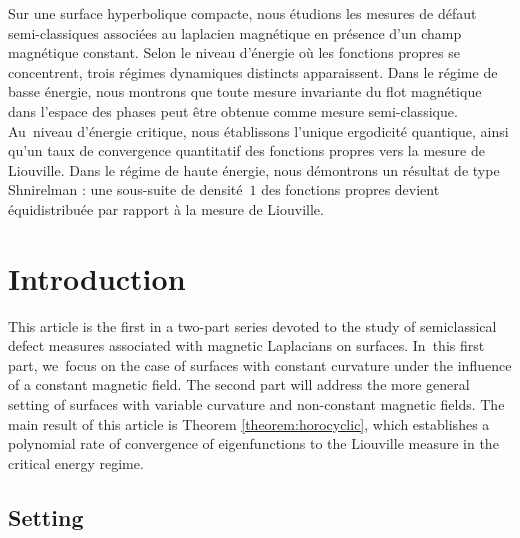 \documentclass[JEP,XML,SOM,Unicode,published]{cedram}
\theoremstyle{plain}
\theoremstyle{definition}
\begin{document}
\begin{altabstract}
Sur une surface hyperbolique compacte, nous étudions les mesures de défaut semi-classiques associées au laplacien magnétique en présence d’un champ magnétique constant. Selon le \hbox{niveau} d’énergie où les fonctions propres se concentrent, trois régimes dynamiques distincts appa\-rais\-sent. Dans le régime de basse énergie, nous montrons que toute mesure invariante du flot magné\-tique dans l’espace des phases peut être obtenue comme mesure semi-classique. Au~\hbox{niveau} d’énergie critique, nous établissons l’unique ergodicité quantique, ainsi qu’un taux de convergence quantitatif des fonctions propres vers la mesure de Liouville. Dans le régime de haute énergie, nous démontrons un résultat de type Shnirelman : une sous-suite de densité~$1$ des fonctions propres devient équidistribuée par rapport à la mesure de Liouville.
\end{altabstract}

\maketitle

\tableofcontents
\mainmatter

\section{Introduction}

This article is the first in a two-part series devoted to the study of semiclassical defect measures associated with magnetic Laplacians on surfaces. In~this first part, we~focus on the case of surfaces with constant curvature under the influence of a constant magnetic field. The second part \cite{Charles-Lefeuvre-25-2} will address the more general setting of surfaces with variable curvature and non-constant magnetic fields. The main result of this article is Theorem \ref{theorem:horocyclic}, which establishes a polynomial rate of convergence of eigenfunctions to the Liouville measure in the critical energy regime.

\subsection{Setting}
\end{document}
